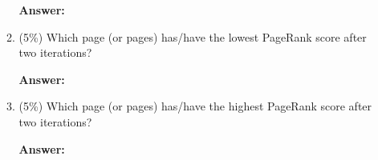 \documentclass[11pt]{article}
\begin{document}
\begin{enumerate}
\begin{enumerate}
            \textbf{Answer:}

            \item (5\%) Which page (or pages) has/have the lowest PageRank score after two iterations?
            
            \textbf{Answer:}

            \item (5\%) Which page (or pages) has/have the highest PageRank score after two iterations?
            
            \textbf{Answer:}

        \end{enumerate}

    \end{enumerate}
\end{document}
